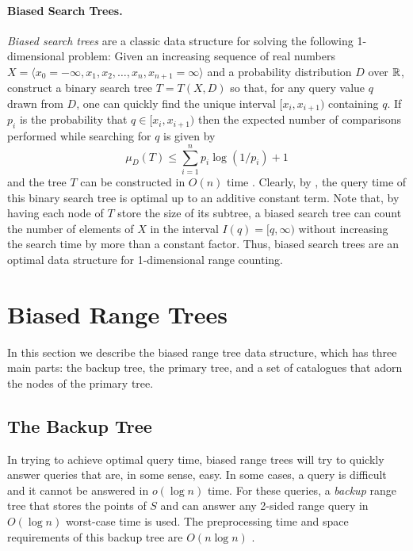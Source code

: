 \documentclass[lotsofwhite,charterfonts]{patmorin}
\begin{document}
\paragraph{Biased Search Trees.}

\emph{Biased search trees} are a classic data structure for solving
the following 1-dimensional problem:  Given an increasing sequence of
real numbers $X=\langle x_0=-\infty,x_1,x_2,\ldots ,
x_n,x_{n+1}=\infty\rangle$ and a probability distribution $D$ over
$\mathbb{R}$, construct a binary search tree  $T=T(X,D)$ so that, for any
query value $q$ drawn from $D$, one can quickly find the unique
interval $[x_i,x_{i+1})$ containing $q$.  If $p_i$ is the probability
that $q\in[x_i,x_{i+1})$ then the expected number of comparisons
performed while searching for $q$ is given
by
\[
   \mu_D(T) \le \sum_{i=1}^{n} p_i\log(1/p_i) + 1 
\]
and the tree $T$ can be constructed in $O(n)$ time \cite{m75}.
Clearly, by , the query time of this binary search
tree is optimal up to an additive constant term.  Note that, by having
each node of $T$ store the size of its subtree, a biased search tree
can count the number of elements of $X$ in the interval
$I(q)=[q,\infty)$ without increasing the search time by more than a
constant factor.  Thus, biased search trees are an optimal data
structure for 1-dimensional range counting.

\section{Biased Range Trees}

In this section we describe the biased range tree data structure,
which has three main parts: the backup tree, the primary tree, and a
set of catalogues that adorn the nodes of the primary tree.

\subsection{The Backup Tree}

In trying to achieve optimal query time, biased range trees will try
to quickly answer queries that are, in some sense, easy.  In some
cases, a query is difficult and it cannot be answered in $o(\log n)$
time.  For these queries, a \emph{backup} range tree that stores the
points of $S$ and can answer any 2-sided range query in $O(\log n)$
worst-case time is used.  The preprocessing time and space
requirements of this backup tree are $O(n\log n)$ \cite{bkos97}.
\end{document}
